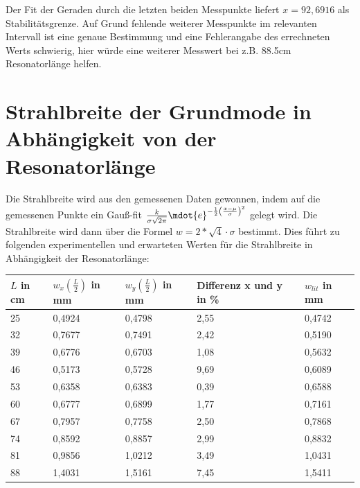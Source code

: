 \documentclass[bigchapter,colorback,accentcolor=tud4b,linedtoc,11pt]{tudreport}
\numberwithin{equation}{subsection}
\begin{document}
Der Fit der Geraden durch die letzten beiden Messpunkte liefert $x=92,6916$ als Stabilitätsgrenze. Auf Grund fehlende weiterer Messpunkte im relevanten Intervall ist eine genaue Bestimmung und eine Fehlerangabe des errechneten Werts schwierig, hier würde eine weiterer Messwert bei z.B. 88.5cm Resonatorlänge helfen.
\section{Strahlbreite der Grundmode in Abhängigkeit von der Resonatorlänge}
Die Strahlbreite wird aus den gemessenen Daten gewonnen, indem auf die gemessenen Punkte ein Gauß-fit 
$\frac{k}{\sigma\sqrt{2\pi}} \mdot {e}^{-\frac{1}{2}\left(\frac{x-\mu}{\sigma}\right)^{2}}$
gelegt wird. Die Strahlbreite wird dann über die Formel
$w=2*\sqrt{4}\cdot\sigma$
bestimmt. Dies führt zu folgenden experimentellen und erwarteten Werten für die Strahlbreite in Abhängigkeit der Resonatorlänge:
\begin{center}
    \begin{tabular}{ | l | l | l | l | p{4cm} |}
    \hline
    $L$ in cm & $w_x\left(\frac{L}{2}\right)$ in mm & $w_y\left(\frac{L}{2}\right)$ in mm & Differenz x und y in \% & $w_{lit}$ in mm \\ \hline
    25 & 0,4924 & 0,4798 & 2,55 & 0,4742 \\ \hline
    32 & 0,7677 & 0,7491 & 2,42 & 0,5190 \\ \hline
    39 & 0,6776 & 0,6703 & 1,08 & 0,5632 \\ \hline
    46 & 0,5173 & 0,5728 & 9,69 & 0,6089 \\ \hline
    53 & 0,6358 & 0,6383 & 0,39 & 0,6588 \\ \hline
    60 & 0,6777 & 0,6899 & 1,77 & 0,7161 \\ \hline
    67 & 0,7957 & 0,7758 & 2,50 & 0,7868 \\ \hline
    74 & 0,8592 & 0,8857 & 2,99 & 0,8832 \\ \hline
    81 & 0,9856 & 1,0212 & 3,49 & 1,0431 \\ \hline
    88 & 1,4031 & 1,5161 & 7,45 & 1,5411 \\ \hline
    \end{tabular}
\end{center}
\end{document}
